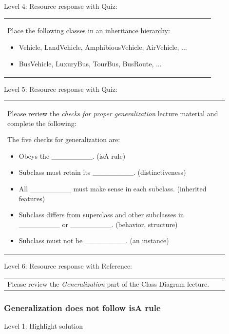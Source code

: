 \noindent Level 4: Resource response with Quiz: \medskip

\begin{tabular}{|p{0.9\linewidth}}
Place the following classes in an inheritance hierarchy:

\begin{itemize}
    \item Vehicle, LandVehicle, AmphibiousVehicle, AirVehicle, ...
    \item BusVehicle, LuxuryBus, TourBus, BusRoute, ...
\end{itemize}

\end{tabular} \medskip

\noindent Level 5: Resource response with Quiz: \medskip

\begin{tabular}{|p{0.9\linewidth}}
Please review the \textit{checks for proper generalization} lecture material
and complete the following:

The five checks for generalization are:
\begin{itemize}
    \item Obeys the \_\_\_\_\_\_\_\_. (isA rule)
    \item Subclass must retain its \_\_\_\_\_\_\_\_. (distinctiveness)
    \item All \_\_\_\_\_\_\_\_ must make sense in each subclass. (inherited features)
    \item Subclass differs from superclass and other subclasses in \_\_\_\_\_\_\_\_ or \_\_\_\_\_\_\_\_. (behavior, structure)
    \item Subclass must not be \_\_\_\_\_\_\_\_. (an instance)
\end{itemize}

\end{tabular} \medskip

\noindent Level 6: Resource response with Reference: \medskip

\begin{tabular}{|p{0.9\linewidth}}
Please review the \textit{Generalization} part of the Class Diagram lecture.
\end{tabular} \medskip


\subsubsection{Generalization does not follow isA rule}

\noindent Level 1: Highlight solution  \medskip

